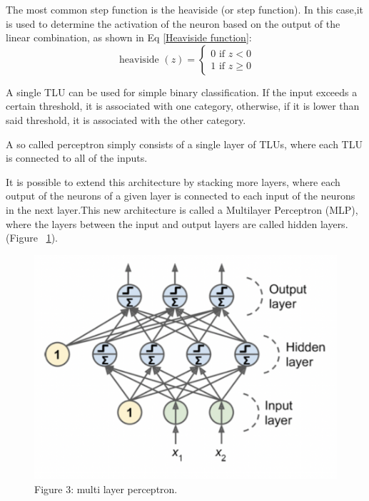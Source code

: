 The most common step function is the heaviside (or step function). In this case,it is used to determine the activation of the neuron based on the output of the linear combination, as shown in Eq \eqref{Heaviside function}: 
\begin{equation} 
    \text { heaviside }(z)=\left\{\begin{array}{l}
    0 \text { if } z<0 \\
    1 \text { if } z \geq 0
    \end{array}\right.
    \label{Heaviside function}
\end{equation} 

A single TLU can be used for simple binary classification. If the input exceeds a certain threshold, it is associated with one category, otherwise, if it is lower than said threshold, it is associated with the other category.

A so called perceptron simply consists of a single layer of TLUs, where each TLU is connected to all of the inputs.

It is possible to extend this architecture by stacking more layers, where each output of the neurons of a given layer is connected to each input of the neurons in the next layer.This new architecture is called a Multilayer Perceptron (MLP), where the layers between the input and output layers are called  hidden layers.
 (Figure ~\ref{fig:Perceptron}).

\begin{figure} [h]
    \centering
\includegraphics[width=\textwidth,height=\textheight,keepaspectratio]{Assets/Theory_and_methods/unnamed-3.png}
    \caption{Figure 3: multi layer perceptron.}
    \label{fig:Perceptron}
\end{figure}

